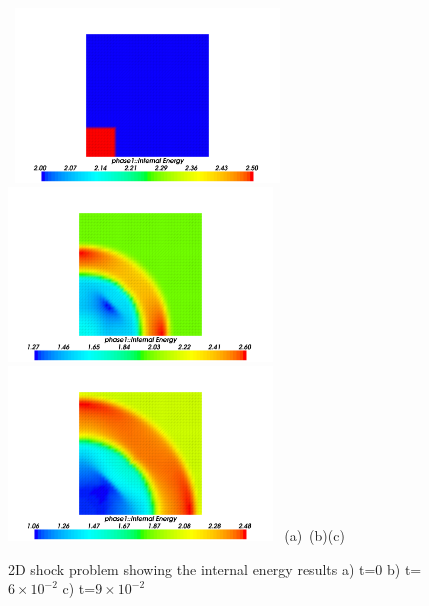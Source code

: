 \begin{figure}[H]
\vbox{
\hbox{
\hspace{-1.cm}
\includegraphics[width=7.0cm]{./doc_figures/shock/2d-shock-e0}
\hspace{-1.cm}
\includegraphics[width=7.0cm]{./doc_figures/shock/2d-shock-e60}
\hspace{-1.cm}
\includegraphics[width=7.0cm]{./doc_figures/shock/2d-shock-e90}
}
\vspace{-0.cm}
\hbox{\hspace{4.cm}(a) \hspace{4.5cm}(b)\hspace{4.5cm}(c)}
\vspace{-0.cm}}
\label{2d-internal-energy-mesh}
\caption{ 2D shock problem showing the internal energy results a) 
t=0 b) t=$6\times 10^{-2}$ c) t=$9\times 10^{-2}$ }
\end{figure}


